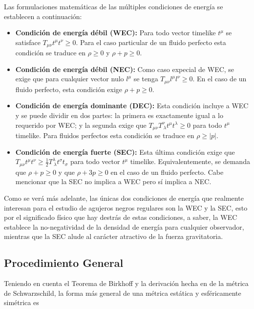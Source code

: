 \documentclass{article}
\numberwithin{equation}{section}
\theoremstyle{definition}
\begin{document}
Las formulaciones matemáticas de las múltiples  condiciones de energía se establecen a continuación:

\begin{itemize}
\item \textbf{Condición de energía débil (WEC):} Para todo vector timelike $t^\mu$ se satisface $T_{\mu \nu}t^{\mu}t^{\nu} \geq 0$. Para el caso particular de un fluido perfecto esta condición se traduce en $\rho \geq 0$ y $\rho + p \geq 0$.

\item \textbf{Condición de energía débil (NEC):} Como caso expecial de WEC, se exige que para cualquier vector nulo $l^\mu$ se tenga $T_{\mu \nu}l^{\mu}l^{\nu} \geq 0$. En el caso de un fluido perfecto, esta condición exige $\rho + p \geq 0$.

\item \textbf{Condición de energía dominante (DEC):} Esta condición incluye a WEC y se puede dividir en dos partes: la primera es exactamente igual a lo requerido por WEC; y la segunda exige que $T_{\mu \nu}T^{\nu}_{\ \lambda}t^{\mu}t^{\lambda} \geq 0$ para todo $t^{\mu}$ timelike. Para fluidos perfectos esta condición se traduce en $\rho \geq |p|$.

\item \textbf{Condición de energía fuerte (SEC):} Esta última condición exige que $T_{\mu \nu}t^{\mu}t^{\nu} \geq \frac{1}{2}T^{\lambda}_{\ \lambda}t^{\sigma}t_{\sigma}$ para todo vector $t^\mu$ timelike. Equivalentemente, se demanda que $\rho + p \geq 0$ y que $\rho + 3p \geq 0$ en el caso de un fluido perfecto. Cabe mencionar que la SEC no implica a WEC pero sí implica a NEC.
\end{itemize}

Como se verá más adelante, las únicas dos condiciones de energía que realmente interesan para el estudio de agujeros negros regulares son la WEC y la SEC, esto por el significado físico que hay destrás de estas condiciones, a saber, la WEC establece la no-negatividad de la densidad de energía para cualquier observador, mientras que la SEC alude al carácter atractivo de la fuerza gravitatoria.\\

\subsection{Procedimiento General}

Teniendo en cuenta el Teorema de Birkhoff \cite{gravitation} y la derivación hecha en \cite[Cap. 7]{carroll-lecture-notes} de la métrica de Schwarzschild, la forma más general de una métrica estática y esféricamente simétrica es
\end{document}

